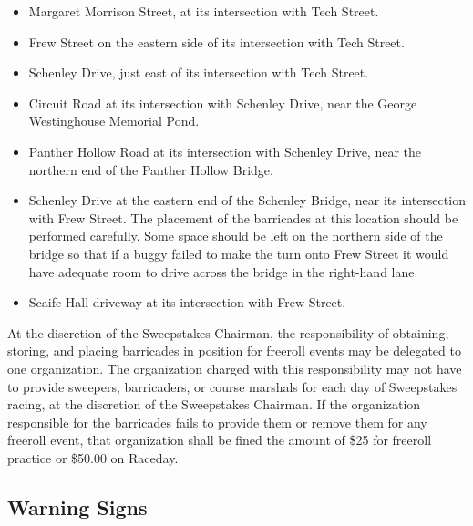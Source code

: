 	\begin{itemize}

		\item Margaret Morrison Street, at its intersection with Tech Street.

		\item Frew Street on the eastern side of its intersection with Tech Street.

		\item Schenley Drive, just east of its intersection with Tech Street.

		\item Circuit Road at its intersection with Schenley Drive, near the George Westinghouse Memorial Pond.

		\item Panther Hollow Road at its intersection with Schenley Drive, near the northern end of the Panther Hollow Bridge.

		\item Schenley Drive at the eastern end of the Schenley Bridge, near its intersection with Frew Street. The placement of the barricades at this location should be performed carefully. Some space should be left on the northern side of the bridge so that if a buggy failed to make the turn onto Frew Street it would have adequate room to drive across the bridge in the right-hand lane.

		\item Scaife Hall driveway at its intersection with Frew Street.

	\end{itemize}

	At the discretion of the Sweepstakes Chairman, the responsibility of obtaining, storing, and placing barricades in position for freeroll events may be delegated to one organization. The organization charged with this responsibility may not have to provide sweepers, barricaders, or course marshals for each day of Sweepstakes racing, at the discretion of the Sweepstakes Chairman. If the organization responsible for the barricades fails to provide them or remove them for any freeroll event, that organization shall be fined the amount of \$25 for freeroll practice or \$50.00 on Raceday.

	
\subsection{Warning Signs}
\label{subsec:WarnSigns}

